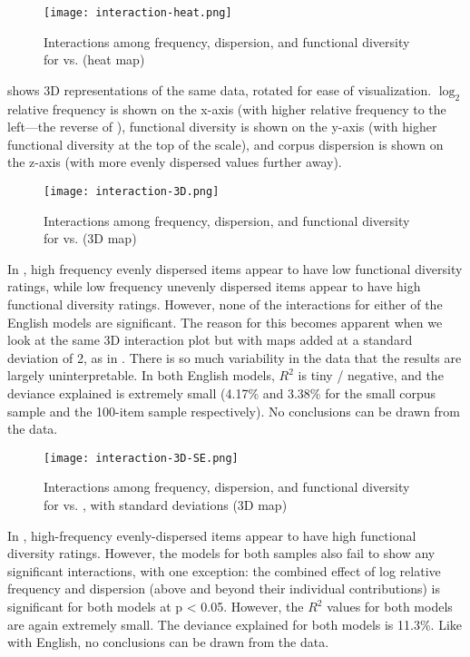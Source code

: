 \begin{figure}
  \centering
  \caption{Interactions among frequency, dispersion, and functional diversity for  vs.  (heat map)}
  \label{fig:interaction-heat}
  \texttt{[image: interaction-heat.png]}
\end{figure}

 shows 3D representations of the same data, rotated for ease of visualization. $\log_2$ relative frequency is shown on the x-axis (with higher relative frequency to the left—the reverse of ), functional diversity is shown on the y-axis (with higher functional diversity at the top of the scale), and corpus dispersion is shown on the z-axis (with more evenly dispersed values further away).

\begin{figure}
  \centering
  \caption{Interactions among frequency, dispersion, and functional diversity for  vs.  (3D map)}
  \label{fig:interaction-3D}
  \texttt{[image: interaction-3D.png]}
\end{figure}

In , high frequency evenly dispersed items appear to have low functional diversity ratings, while low frequency unevenly dispersed items appear to have high functional diversity ratings. However, none of the interactions for either of the English models are significant. The reason for this becomes apparent when we look at the same 3D interaction plot but with maps added at a standard deviation of 2, as in . There is so much variability in the data that the results are largely uninterpretable. In both English models, $R^2$ is tiny / negative, and the deviance explained is extremely small (4.17\% and 3.38\% for the small corpus sample and the 100-item sample respectively). No conclusions can be drawn from the data.

\begin{figure}
  \centering
  \caption{Interactions among frequency, dispersion, and functional diversity for  vs. , with standard deviations (3D map)}
  \label{fig:interaction-3D-SD}
  \texttt{[image: interaction-3D-SE.png]}
\end{figure}

In , high-frequency evenly-dispersed items appear to have high functional diversity ratings. However, the models for both  samples also fail to show any significant interactions, with one exception: the combined effect of log relative frequency and dispersion (above and beyond their individual contributions) is significant for both models at p < 0.05. However, the $R^2$ values for both models are again extremely small. The deviance explained for both models is 11.3\%. Like with English, no conclusions can be drawn from the data.

